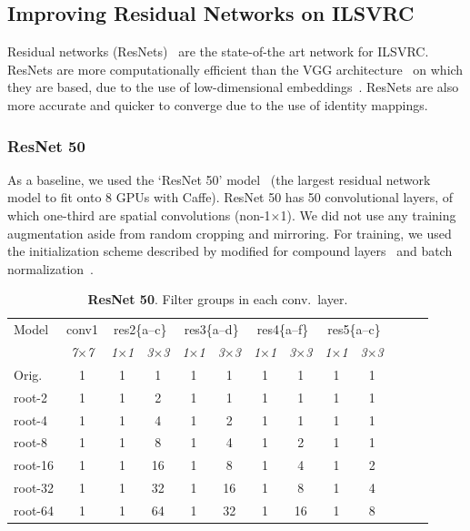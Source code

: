 \documentclass[thesis]{subfiles}
\begin{document}
	\subsection{Improving Residual Networks on ILSVRC}
	Residual networks (ResNets)~\citep{He2015} are the state-of-the art network for ILSVRC\@. ResNets are more computationally efficient than the VGG architecture~\cite{Simonyan2014verydeep} on which they are based, due to the use of low-dimensional embeddings~\citep{Lin2013NiN}. ResNets are also more accurate and quicker to converge due to the use of identity mappings.
	
	\subsubsection{ResNet 50}
	\label{resnet50results}
	As a baseline, we used the `ResNet 50' model~\citep{He2015} (the largest residual network model to fit onto 8 GPUs with Caffe). ResNet 50 has 50 convolutional layers, of which one-third are spatial convolutions (non-1$\times$1). We did not use any training augmentation aside from random cropping and mirroring. 
	For training, we used the initialization scheme described by \citep{He2015b} modified for compound layers~\citep{Ioannou2016} and batch normalization~\citep{Ioffe2015}.
	\begin{table}[tp]
		\caption[ResNet 50 root architectures.]{\textbf{ResNet 50}. Filter groups in each conv.\ layer.}
		\label{table:resnet50config}
		\centering
		\begin{tabular}{@{}lcccccccccccc@{}}
			\toprule
			Model & conv1 & \multicolumn{2}{c}{res2\{a--c\}} & \multicolumn{2}{c}{res3\{a--d\}} & \multicolumn{2}{c}{res4\{a--f\}} & \multicolumn{2}{c}{res5\{a--c\}} \\
			& \textit{\footnotesize7$\times$7} & \textit{\footnotesize1$\times$1} & \textit{\footnotesize3$\times$3} & \textit{\footnotesize1$\times$1} & \textit{\footnotesize3$\times$3} & \textit{\footnotesize1$\times$1} & \textit{\footnotesize3$\times$3} & \textit{\footnotesize1$\times$1} & \textit{\footnotesize3$\times$3} \\
			Orig. & 1 & 1 & 1 & 1 &  1 & 1 &  1 & 1 & 1 \\
			\midrule
			root-2 & 1 & 1 & 2 & 1 &  1 & 1 &  1 & 1 & 1 \\
			root-4 & 1 & 1 & 4 & 1 &  2 & 1 &  1 & 1 & 1 \\
			root-8 & 1 & 1 & 8 & 1 &  4 & 1 &  2 & 1 & 1 \\
			root-16 & 1 & 1 & 16 & 1 &  8 & 1 &  4 & 1 & 2 \\
			root-32 & 1 & 1 & 32 & 1 & 16 & 1 &  8 & 1 & 4 \\
			root-64 & 1 & 1 & 64 & 1 & 32 & 1 & 16 & 1 & 8 \\
			\bottomrule
		\end{tabular}
	\end{table}
\end{document}

